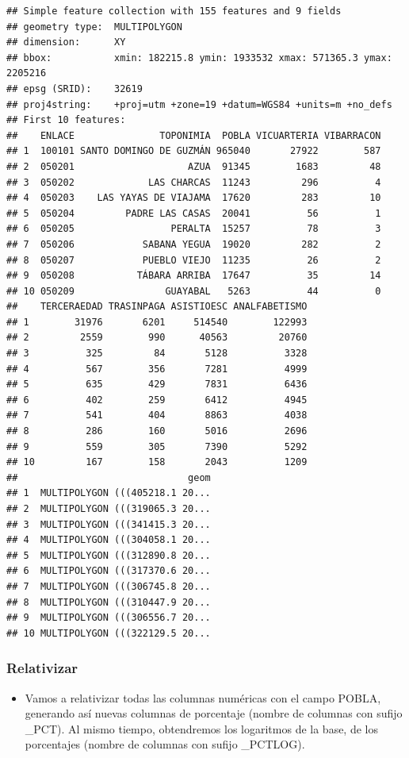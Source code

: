 \documentclass[11pt,]{article}
\providecommand{\tightlist}{%
\setlength{\itemsep}{0pt}\setlength{\parskip}{0pt}}
\begin{document}
\begin{verbatim}
## Simple feature collection with 155 features and 9 fields
## geometry type:  MULTIPOLYGON
## dimension:      XY
## bbox:           xmin: 182215.8 ymin: 1933532 xmax: 571365.3 ymax: 2205216
## epsg (SRID):    32619
## proj4string:    +proj=utm +zone=19 +datum=WGS84 +units=m +no_defs
## First 10 features:
##    ENLACE               TOPONIMIA  POBLA VICUARTERIA VIBARRACON
## 1  100101 SANTO DOMINGO DE GUZMÁN 965040       27922        587
## 2  050201                    AZUA  91345        1683         48
## 3  050202             LAS CHARCAS  11243         296          4
## 4  050203    LAS YAYAS DE VIAJAMA  17620         283         10
## 5  050204         PADRE LAS CASAS  20041          56          1
## 6  050205                 PERALTA  15257          78          3
## 7  050206            SABANA YEGUA  19020         282          2
## 8  050207            PUEBLO VIEJO  11235          26          2
## 9  050208           TÁBARA ARRIBA  17647          35         14
## 10 050209                GUAYABAL   5263          44          0
##    TERCERAEDAD TRASINPAGA ASISTIOESC ANALFABETISMO
## 1        31976       6201     514540        122993
## 2         2559        990      40563         20760
## 3          325         84       5128          3328
## 4          567        356       7281          4999
## 5          635        429       7831          6436
## 6          402        259       6412          4945
## 7          541        404       8863          4038
## 8          286        160       5016          2696
## 9          559        305       7390          5292
## 10         167        158       2043          1209
##                              geom
## 1  MULTIPOLYGON (((405218.1 20...
## 2  MULTIPOLYGON (((319065.3 20...
## 3  MULTIPOLYGON (((341415.3 20...
## 4  MULTIPOLYGON (((304058.1 20...
## 5  MULTIPOLYGON (((312890.8 20...
## 6  MULTIPOLYGON (((317370.6 20...
## 7  MULTIPOLYGON (((306745.8 20...
## 8  MULTIPOLYGON (((310447.9 20...
## 9  MULTIPOLYGON (((306556.7 20...
## 10 MULTIPOLYGON (((322129.5 20...
\end{verbatim}

\subsubsection{Relativizar}\label{relativizar}

\begin{itemize}
\tightlist
\item
  Vamos a relativizar todas las columnas numéricas con el campo POBLA,
  generando así nuevas columnas de porcentaje (nombre de columnas con
  sufijo \_PCT). Al mismo tiempo, obtendremos los logaritmos de la base,
  de los porcentajes (nombre de columnas con sufijo \_PCTLOG).
\end{itemize}
\end{document}

